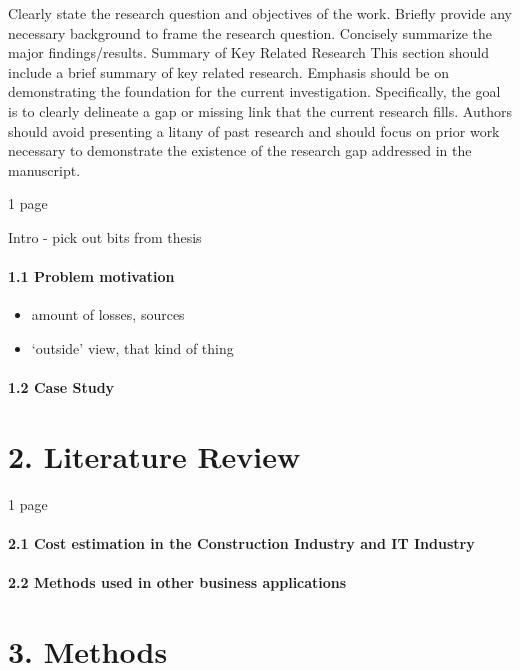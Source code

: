 \documentclass[]{elsarticle} %
\begin{document}
Clearly state the research question and objectives of the work. Briefly
provide any necessary background to frame the research question.
Concisely summarize the major findings/results. Summary of Key Related
Research This section should include a brief summary of key related
research. Emphasis should be on demonstrating the foundation for the
current investigation. Specifically, the goal is to clearly delineate a
gap or missing link that the current research fills. Authors should
avoid presenting a litany of past research and should focus on prior
work necessary to demonstrate the existence of the research gap
addressed in the manuscript.

1 page

Intro - pick out bits from thesis

\paragraph{1.1 Problem motivation}\label{problem-motivation}

\begin{itemize}
\item
  amount of losses, sources
\item
  `outside' view, that kind of thing
\end{itemize}

\paragraph{1.2 Case Study}\label{case-study}

\section{2. Literature Review}\label{literature-review}

1 page

\paragraph{2.1 Cost estimation in the Construction Industry and IT
Industry}\label{cost-estimation-in-the-construction-industry-and-it-industry}

\paragraph{2.2 Methods used in other business
applications}\label{methods-used-in-other-business-applications}

\section{3. Methods}\label{methods}
\end{document}
